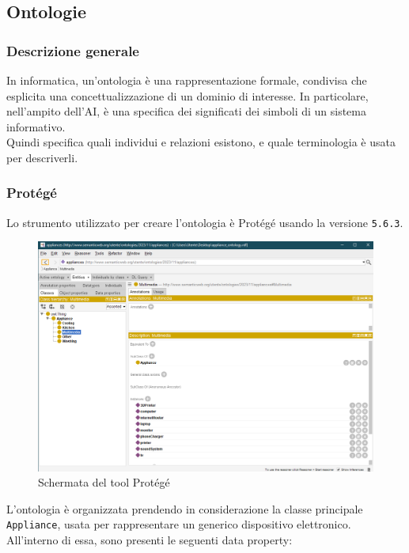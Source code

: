 \documentclass[12pt, letterpaper]{article}
\begin{document}
\subsection{Ontologie}

\subsubsection{Descrizione generale}

In informatica, un'ontologia è una rappresentazione formale, condivisa che esplicita
una concettualizzazione di un dominio di interesse. In particolare, nell'ampito dell'AI,
è una specifica dei significati dei simboli di un sistema informativo. \\

\noindent Quindi specifica quali individui e relazioni esistono, e quale
terminologia è usata per descriverli.

\subsubsection{Protégé}

Lo strumento utilizzato per creare l'ontologia è Protégé \cite{protege} usando la versione
\texttt{5.6.3}.

\pagebreak

\begin{figure}[h]
      \centering
      \includegraphics[scale=0.4]{protege-home.png}
      \caption{Schermata del tool Protégé}
\end{figure}

\noindent L'ontologia è organizzata prendendo in considerazione la classe
principale \texttt{Appliance}, usata per rappresentare un generico dispositivo elettronico.
All'interno di essa, sono presenti le seguenti data property:
\end{document}
